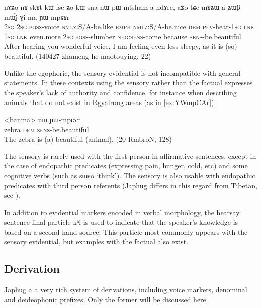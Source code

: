 \documentclass[oldfontcommands,oneside,a4paper,11pt]{article}
\newcommand{\ipa}[1]{{\phon#1}} %
\begin{document}
\begin{exe}
\ex \label{ex:aZWB.mWjGi} 
\gll 
\ipa{nɤʑo}  	\ipa{nɤ-skɤt}  	\ipa{kɯ-fse}  	\ipa{ʑo}  	\ipa{kɯ-sna}  	\ipa{nɯ}  	\ipa{pɯ-mtsham-a}  	\ipa{ndɤre,}  	\ipa{aʑo}  	\ipa{tɕe}  	\ipa{mɤʑɯ}  	\ipa{a-ʑɯβ}  	\ipa{mɯ́j-ɣi}  	\ipa{ma}  	\ipa{ɲɯ-mpɕɤr}   \\
\textsc{2sg} \textsc{2sg.poss}-voice \textsc{nmlz}:S/A-be.like \textsc{emph} \textsc{nmlz}:S/A-be.nice \textsc{dem} \textsc{pfv}-hear-\textsc{1sg} \textsc{lnk}  \textsc{1sg} \textsc{lnk} even.more  \textsc{2sg.poss}-slumber \textsc{neg:sens}-come because \textsc{sens}-be.beautiful \\
\glt After hearing you wonderful voice, I am feeling even less sleepy, as it is (so) beautiful. (140427 zhameng he maotouying, 22)
\end{exe}

Unlike the egophoric, the sensory evidential is not incompatible with general statements. In these contexts using the sensory rather than the factual expresses the speaker's lack of authority and confidence, for instance when describing animals that do not exist in Rgyalrong areas (as in \ref{ex:YWmpCAr}).

 
\begin{exe}
\ex \label{ex:YWmpCAr}
\gll 
<banma> 	\ipa{nɯ}  	\ipa{ɲɯ-mpɕɤr}  \\
zebra \textsc{dem} \textsc{sens}-be.beautiful \\
\glt The zebra is (a) beautiful (animal). (20 RmbroN, 128)
\end{exe}

The sensory is rarely used with the first person in affirmative sentences, except in the case of endopathic predicates (expressing pain, hunger, cold, etc) and some cognitive verbs (such as \ipa{sɯso} `think'). The sensory is also usable with endopathic predicates with third person referents (Japhug differs in this regard from Tibetan, see \citealt[244]{tournadre14evidentiality}).

In addition to evidential markers encoded in verbal morphology, the hearsay sentence final particle \ipa{kʰi} is used to indicate that the speaker's knowledge is based on a second-hand source. This particle most commonly appears with the sensory evidential, but examples with the factual also exist.

\subsection{Derivation}
Japhug a a very rich system of derivations, including voice markers, denominal and deideophonic prefixes. Only the former will be discussed here.
\end{document}
